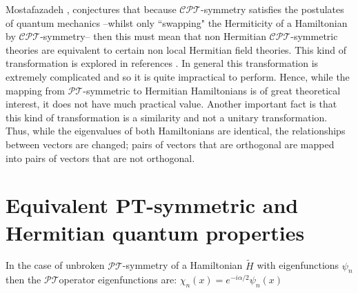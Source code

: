 \documentclass[12pt, a4paper]{report}
\newcommand\PT{\(\mathcal{PT}\)}
\newcommand\CPT{\(\mathcal{CPT}\)}
\begin{document}
Mostafazadeh \cite{Mostafazadeh}, conjectures that because \CPT-symmetry satisfies the postulates of quantum mechanics --whilst only ``swapping" the Hermiticity of a Hamiltonian by \CPT-symmetry-- then this must mean that non Hermitian \CPT-symmetric theories are equivalent to certain non local Hermitian field theories. This kind of transformation is explored in references \cite{Mostafazadeh, EquivalentHH, Pseudo-HermiticityIII, Jones_2005,taleof2potentials}.
In general this transformation is extremely complicated and so it is quite impractical to perform. Hence, while the mapping from \PT-symmetric to Hermitian Hamiltonians is of great theoretical interest, it does not have much practical value\cite{MakingSense}. Another important fact is that this kind of transformation is a similarity and not a unitary transformation. Thus, while the eigenvalues of both Hamiltonians are identical, the relationships between
vectors are changed; pairs of vectors that are orthogonal are mapped into pairs of vectors that are not orthogonal\cite{MakingSense, Bender_2007}.

\section{Equivalent PT-symmetric and Hermitian quantum properties}\label{Dict}
In the case of unbroken \PT-symmetry of a Hamiltonian $\tilde{H}$ with eigenfunctions $\psi_n$ then the \PT\:operator eigenfunctions are: $\chi_{n}(x) = e^{-i\alpha/2}\psi_n(x)$\\
\end{document}
